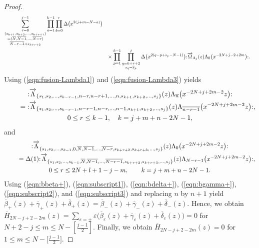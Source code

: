\documentclass[10pt,a4paper]{amsart}
\numberwithin{equation}{section}
\begin{document}
\begin{proof}
\begin{align}
\sum\limits_{\substack{r=0\\(s_{k+1},s_{k+2},\dots, s_{k+r+1})\\
=(\overline{N}, \overline{N-1},\dots, \overline{N-r})
\\ \overline{N-r-1}\prec s_{k+r+2}}}^{j-1}
\prod_{a=1}^{k-1}\prod_{b=0}^r \Delta\big(x^{2(j+m-N-a)}\big)\notag
\\
&\phantom{+}\times\prod_{p=1}^{k-1}\prod\limits_{\substack{q=k+r+2\\s_q=\overline{s}_p}}^j
\Delta\big(x^{2(q-p+s_p-N-1)}\big){:}
\overrightarrow{\Omega}_{\Lambda_j}(z)\Lambda_0\big(x^{-2N+j-2+2m}\big){:}.
\label{eqn:bgamma+}
\end{align}
Using (\ref{eqn:fusion-Lambda1}) and (\ref{eqn:fusion-Lambda3}) yields
\begin{gather}
{:}\overrightarrow{\Lambda}_{\{
s_1,s_2, \dots, s_{k-r-1}, n-r, n-r+1,\dots, n, s_{k+1}, s_{k+2}, \dots, s_{j}
\}}(z) \Lambda_{\overline{n}}\big(x^{-2N+j+2m-2}z\big){:}\notag
\\ \qquad
{}={:}\overrightarrow{\Lambda}_{\{
s_1,s_2, \dots, s_{k-r-1}, n-r-1, n-r,\dots, n-1, s_{k+1}, s_{k+2}, \dots, s_{j}
\}}(z) \Lambda_{\overline{n-r-1}}\big(x^{-2N+j+2m-2}z\big){:},\notag
\\
0\leq r \leq k-1,\quad k=j+m+n-2N-1,
\label{eqn:subscript2}
\end{gather}
and
\begin{gather}
{:}\overrightarrow{\Lambda}_{\{
s_1,s_2, \dots, s_{k-1}, 0, \overline{N}, \overline{N-1}, \dots,
\overline{N-r}, s_{k+r+2}, s_{k+r+3}, \dots, s_{j}
\}}(z) \Lambda_{0}\big(x^{-2N+j+2m-2}z\big){:}\notag
\\ \qquad
{}=\Delta(1)
{:}\overrightarrow{\Lambda}_{\{
s_1,s_2, \dots, s_{k-1}, \overline{N}, \overline{N-1}, \dots,
\overline{N-r-1}, s_{k+r+2}, s_{k+r+3}, \dots, s_{j}\}}(z)
\Lambda_{N-r-1}\big(x^{-2N+j+2m-2}z\big){:},\notag
\\
0\leq r \leq 2N+l+1-j-m,\qquad k=j+m+n-2N-1.
\label{eqn:subscript3}
\end{gather}
Using (\ref{eqn:bbeta+}), (\ref{eqn:subscript1}), (\ref{eqn:bdelta+}),
(\ref{eqn:bgamma+}), (\ref{eqn:subscript2}), and (\ref{eqn:subscript3})
and replacing $n$ by $n+1$
yield $\overline{\beta}_+(z)+\overline{\gamma}_+(z)+\overline{\delta}_+(z)
=\overline{\beta}_-(z)+\overline{\gamma}_-(z)+\overline{\delta}_-(z)$.
Hence, we obtain
$\overline{H}_{2N-j+2-2m}(z)=\sum_{\varepsilon=\pm}\varepsilon
\big(\overline{\beta}_\varepsilon(z)+\overline{\gamma}_\varepsilon(z)
+\overline{\delta}_\varepsilon(z)\big)=0$
for $N+2-j \leq m \leq N-[\frac{j-1}{2}]$.
Finally, we obtain
$\overline{H}_{2N-j+2-2m}(z)=0$ for $1 \leq m \leq N-\big[\frac{j-1}{2}\big]$.


\end{proof}
\end{document}
